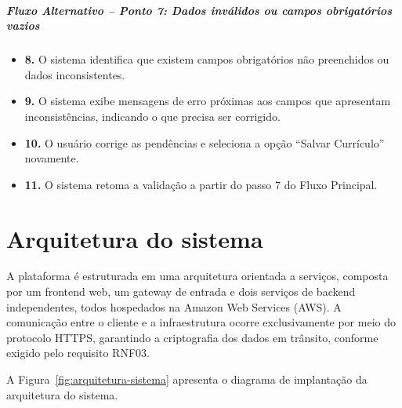 \documentclass[
    12pt,
    oneside,
    a4paper,
    brazil
]{abntex2}
\begin{document}
\paragraph{Fluxo Alternativo -- Ponto 7: Dados inválidos ou campos obrigatórios vazios}
\begin{itemize}
    \item \textbf{8.} O sistema identifica que existem campos obrigatórios não preenchidos ou dados inconsistentes.
    \item \textbf{9.} O sistema exibe mensagens de erro próximas aos campos que apresentam inconsistências, indicando o que precisa ser corrigido.
    \item \textbf{10.} O usuário corrige as pendências e seleciona a opção ``Salvar Currículo'' novamente.
    \item \textbf{11.} O sistema retoma a validação a partir do passo 7 do Fluxo Principal.
\end{itemize}

\chapter{Arquitetura do sistema}

A plataforma é estruturada em uma arquitetura orientada a serviços, composta por um frontend web, um gateway de entrada e dois serviços de backend independentes, todos hospedados na Amazon Web Services (AWS). A comunicação entre o cliente e a infraestrutura ocorre exclusivamente por meio do protocolo HTTPS, garantindo a criptografia dos dados em trânsito, conforme exigido pelo requisito RNF03.

A Figura~\ref{fig:arquitetura-sistema} apresenta o diagrama de implantação da arquitetura do sistema.
\end{document}
